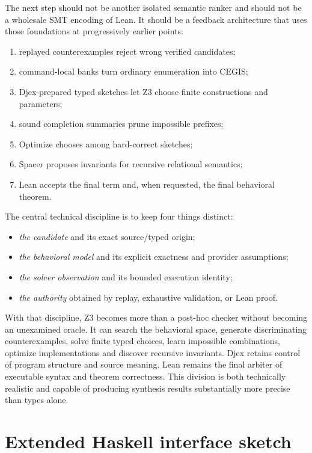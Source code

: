 \documentclass[11pt,oneside]{report}
\begin{document}
The next step should not be another isolated semantic ranker and should not be a wholesale SMT encoding of Lean. It should be a feedback architecture that uses those foundations at progressively earlier points:

\begin{enumerate}[leftmargin=2em]
\item replayed counterexamples reject wrong verified candidates;
\item command-local banks turn ordinary enumeration into CEGIS;
\item Djex-prepared typed sketches let Z3 choose finite constructions and parameters;
\item sound completion summaries prune impossible prefixes;
\item Optimize chooses among hard-correct sketches;
\item Spacer proposes invariants for recursive relational semantics;
\item Lean accepts the final term and, when requested, the final behavioral theorem.
\end{enumerate}

The central technical discipline is to keep four things distinct:

\begin{itemize}[leftmargin=2em]
\item \emph{the candidate} and its exact source/typed origin;
\item \emph{the behavioral model} and its explicit exactness and provider assumptions;
\item \emph{the solver observation} and its bounded execution identity;
\item \emph{the authority} obtained by replay, exhaustive validation, or Lean proof.
\end{itemize}

With that discipline, Z3 becomes more than a post-hoc checker without becoming an unexamined oracle. It can search the behavioral space, generate discriminating counterexamples, solve finite typed choices, learn impossible combinations, optimize implementations and discover recursive invariants. Djex retains control of program structure and source meaning. Lean remains the final arbiter of executable syntax and theorem correctness. This division is both technically realistic and capable of producing synthesis results substantially more precise than types alone.


\appendix

\chapter{Extended Haskell interface sketch}
\label{app:haskell-api}
\end{document}
